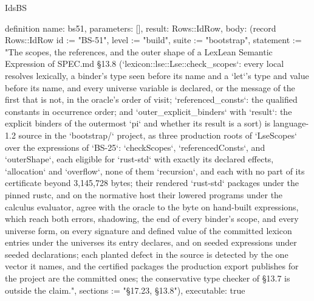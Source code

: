 \begin{lexlean}{IdsBS}
\begin{semanticmodule}
definition{
  name: bs51,
  parameters: [],
  result: Rows::IdRow,
  body: (record Rows::IdRow {id := "BS-51", level := "build", suite := "bootstrap", statement := "The scopes, the references, and the outer shape of a LexLean Semantic Expression of SPEC.md §13.8 (`lexicon::lse::Lse::check_scopes`: every local resolves lexically, a binder's type seen before its name and a `let`'s type and value before its name, and every universe variable is declared, or the message of the first that is not, in the oracle's order of visit; `referenced_consts`: the qualified constants in occurrence order; and `outer_explicit_binders` with `result`: the explicit binders of the outermost `pi` and whether its result is a sort) is language-1.2 source in the `bootstrap/` project, as three production roots of `LseScopes` over the expressions of `BS-25`: `checkScopes`, `referencedConsts`, and `outerShape`, each eligible for `rust-std` with exactly its declared effects, `allocation` and `overflow`, none of them `recursion`, and each with no part of its certificate beyond 3,145,728 bytes; their rendered `rust-std` packages under the pinned rustc, and on the normative host their lowered programs under the calculus evaluator, agree with the oracle to the byte on hand-built expressions, which reach both errors, shadowing, the end of every binder's scope, and every universe form, on every signature and defined value of the committed lexicon entries under the universes its entry declares, and on seeded expressions under seeded declarations; each planted defect in the source is detected by the one vector it names, and the certified packages the production export publishes for the project are the committed ones; the conservative type checker of §13.7 is outside the claim.", sections := "§17.23, §13.8"}),
  executable: true
}


\end{semanticmodule}
\end{lexlean}
